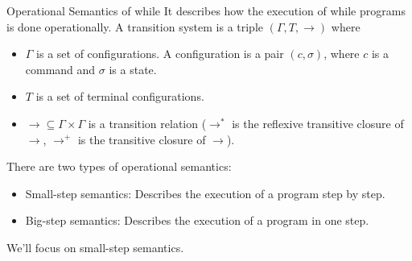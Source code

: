 \documentclass{beamer}
\begin{document}
    \begin{frame}{Operational Semantics of while}
      It describes how the execution of while programs is done operationally.
      \vspace*{0.5cm}
      A transition system is a triple $(\Gamma, T,\to)$ where
      \begin{itemize}
        \item $\Gamma$ is a set of configurations. A configuration is a pair $(c,\sigma)$, where $c$ is a command and $\sigma$ is a state.
        \item $T$ is a set of terminal configurations.
        \item $\to\subseteq\Gamma\times\Gamma$ is a transition relation ($\to^*$ is the reflexive transitive closure of $\to$, $\to^+$ is the transitive closure of $\to$).
      \end{itemize}
      \vspace*{0.5cm}
      There are two types of operational semantics:
      \begin{itemize}
        \item Small-step semantics: Describes the execution of a program step by step.
        \item Big-step semantics: Describes the execution of a program in one step.
      \end{itemize} 
      We'll focus on small-step semantics.
      \end{frame}
      
\end{document}
